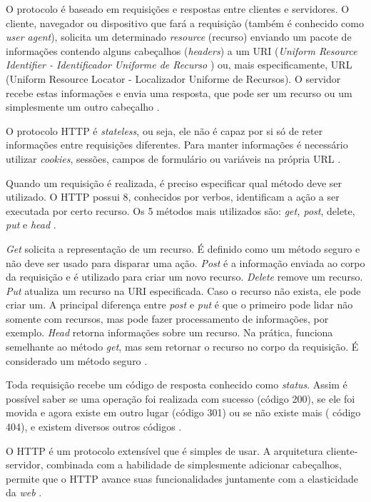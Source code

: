  O protocolo é baseado em requisições e respostas entre clientes e servidores. O cliente, navegador ou dispositivo que fará a requisição (também é conhecido como \textit{user agent}), solicita um determinado  \textit{resource} (recurso) enviando um pacote de informações contendo alguns cabeçalhos (\textit{headers}) a um URI (\textit{Uniform Resource Identifier - Identificador Uniforme de Recurso }) ou, mais especificamente, URL (Uniform Resource Locator - Localizador Uniforme de Recursos). O servidor recebe estas informações e envia uma resposta, que pode ser um recurso ou um simplesmente um outro cabeçalho \cite{vieira2007}.
 
 O protocolo HTTP é\textit{ stateless}, ou seja, ele não é capaz por si só de reter informações entre requisições diferentes. Para manter informações é necessário utilizar \textit{cookies}, sessões, campos de formulário ou variáveis na própria URL \cite{vieira2007}.
 
Quando um requisição é realizada, é preciso especificar qual método deve ser utilizado. O HTTP possui 8,  conhecidos por verbos, 
identificam a ação a ser executada por certo recurso.  Os 5 métodos mais utilizados são: \textit{get, post}, delete, \textit{put} e \textit{head} \cite{vieira2007}\cite{szigalski2018}. 

\textit{Get} solicita a representação  de um recurso. É definido como um método seguro e não deve ser usado para disparar uma ação.  \textit{Post} é a informação enviada ao corpo da requisição e é utilizado para criar um novo recurso. \textit{Delete} remove um recurso. \textit{Put} atualiza um recurso na URI especificada. Caso o recurso não exista, ele pode criar um. A principal diferença entre \textit{post} e \textit{put} é que o primeiro pode lidar não somente com recursos, mas pode fazer processamento de informações, por exemplo. \textit{Head} retorna informações sobre um recurso. Na prática, funciona semelhante ao método \textit{get}, mas sem retornar o recurso no corpo da requisição. É considerado um método seguro \cite{vieira2007}.

Toda requisição recebe um código de resposta conhecido como \textit{status}.  Assim é possível saber se uma operação foi realizada com sucesso (código 200), se ele foi movida e agora existe em outro lugar (código 301) ou se não existe mais ( código 404), e existem diversos outros códigos \cite{vieira2007}.

O HTTP é um protocolo extensível que é simples de usar. A arquitetura cliente-servidor, combinada com a habilidade de simplesmente adicionar cabeçalhos, permite que o HTTP avance suas funcionalidades juntamente com a elasticidade da \textit{web} \cite{szigalski2018}.



